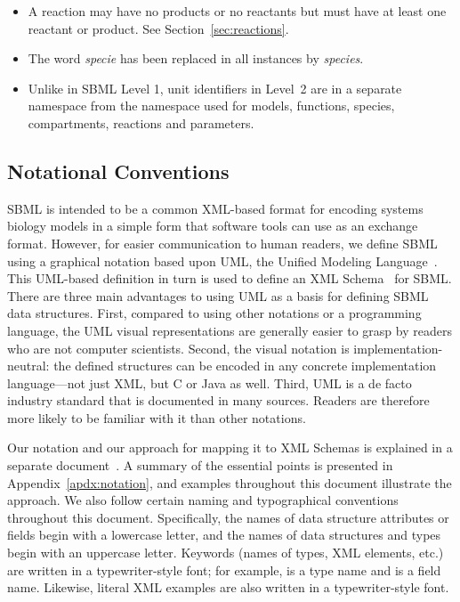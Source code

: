 \documentclass[10pt,twocolumntoc]{cekarticle}
\begin{document}
\begin{itemize}
\item A reaction may have no products or no reactants but must have at
  least one reactant or product.  See Section~\ref{sec:reactions}.
  
\item The word \emph{specie} has been replaced in all instances by
  \emph{species}.

\item Unlike in SBML Level 1, unit identifiers in Level~2 are in a separate
  namespace from the namespace used for models, functions, species,
  compartments, reactions and parameters.

\end{itemize}

\subsection{Notational Conventions}

SBML is intended to be a common XML-based format for encoding systems
biology models in a simple form that software tools can use as an exchange
format.  However, for easier communication to human readers, we define SBML
using a graphical notation based upon UML, the Unified Modeling
Language~\citep{eriksson:1998,oestereich:1999}.  This UML-based definition
in turn is used to define an XML
Schema~\citep{biron:2000,fallside:2000,thompson:2000} for SBML.  There are
three main advantages to using UML as a basis for defining SBML data
structures.  First, compared to using other notations or a programming
language, the UML visual representations are generally easier to grasp by
readers who are not computer scientists.  Second, the visual notation is
implementation-neutral: the defined structures can be encoded in any
concrete implementation language---not just XML, but C or Java as well.
Third, UML is a de facto industry standard that is documented in many
sources.  Readers are therefore more likely to be familiar with it than
other notations.

Our notation and our approach for mapping it to XML Schemas is explained in
a separate document~\citep{hucka:2000b}.  A summary of the essential points
is presented in Appendix~\ref{apdx:notation}, and examples throughout this
document illustrate the approach.  We also follow certain naming and
typographical conventions throughout this document.  Specifically, the
names of data structure attributes or fields begin with a lowercase letter,
and the names of data structures and types begin with an uppercase letter.
Keywords (names of types, XML elements, etc.) are written in a
typewriter-style font; for example,  is a type name and
 is a field name.  Likewise, literal XML examples are
also written in a typewriter-style font.
\end{document}
